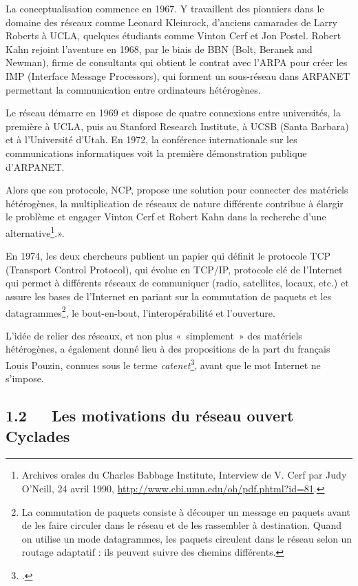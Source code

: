 \documentclass{FramateX}
\begin{document}
\begin{refsection}
La conceptualisation commence en 1967. Y travaillent des pionniers dans
le domaine des réseaux comme Leonard Kleinrock,
d'anciens camarades de Larry Roberts à UCLA, quelques
étudiants comme Vinton Cerf et Jon Postel. Robert Kahn rejoint
l'aventure en 1968, par le biais de BBN (Bolt,
Beranek and Newman), firme de consultants qui obtient le contrat avec
l'ARPA pour créer les IMP (Interface Message
Processors), qui forment un sous-réseau dans ARPANET permettant la
communication entre ordinateurs hétérogènes. 

Le réseau démarre en 1969 et dispose de quatre connexions entre
universités, la première à UCLA, puis au Stanford Research
Institute, à UCSB (Santa Barbara) et à l'Université
d'Utah. En 1972, la conférence internationale sur les
communications informatiques voit la première démonstration publique
d'ARPANET. 

Alors que son protocole, NCP, propose une solution pour connecter des
matériels hétérogènes, la multiplication de réseaux de nature
différente contribue à élargir le problème et engager Vinton Cerf et
Robert Kahn dans la recherche d'une
alternative\footnote{Archives orales du Charles Babbage
Institute, Interview de V. Cerf par Judy
O'Neill, 24 avril 1990, \url{http://www.cbi.umn.edu/oh/pdf.phtml?id=81}.}.».

En 1974, les deux chercheurs publient un papier qui définit le protocole
TCP (Transport Control Protocol), qui évolue en TCP/IP,
protocole clé de l'Internet qui permet à différents
réseaux de communiquer (radio, satellites, locaux, etc.) et assure les
bases de l'Internet en pariant sur la commutation de
paquets et les datagrammes\footnote{La commutation de paquets
consiste à découper un message en paquets avant de les faire circuler
dans le réseau et de les rassembler à destination. Quand on utilise un
mode datagrammes, les paquets circulent dans le réseau selon un routage
adaptatif : ils peuvent suivre des chemins différents.}, le
bout-en-bout, l'interopérabilité et
l'ouverture. 

L'idée de relier des réseaux, et non plus
«~simplement~» des matériels hétérogènes, a également donné lieu à des
propositions de la part du français Louis Pouzin, connues sous le terme  \textit{catenet}\footnote{\cite{pouzinproposal1974}.}, avant que le
mot Internet ne s'impose.




\subsection*{1.2~~~Les motivations du réseau ouvert Cyclades}
{}



\end{refsection}
\end{document}
